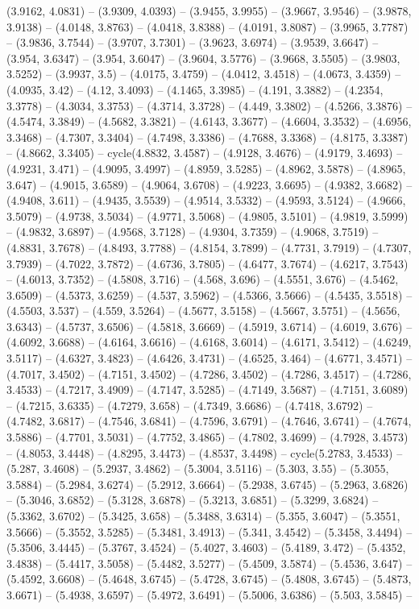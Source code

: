 (3.9162, 4.0831) -- (3.9309, 4.0393) -- (3.9455, 3.9955) -- (3.9667, 3.9546) -- (3.9878, 3.9138) -- (4.0148, 3.8763) -- (4.0418, 3.8388) -- (4.0191, 3.8087) -- (3.9965, 3.7787) -- (3.9836, 3.7544) -- (3.9707, 3.7301) -- (3.9623, 3.6974) -- (3.9539, 3.6647) -- (3.954, 3.6347) -- (3.954, 3.6047) -- (3.9604, 3.5776) -- (3.9668, 3.5505) -- (3.9803, 3.5252) -- (3.9937, 3.5) -- (4.0175, 3.4759) -- (4.0412, 3.4518) -- (4.0673, 3.4359) -- (4.0935, 3.42) -- (4.12, 3.4093) -- (4.1465, 3.3985) -- (4.191, 3.3882) -- (4.2354, 3.3778) -- (4.3034, 3.3753) -- (4.3714, 3.3728) -- (4.449, 3.3802) -- (4.5266, 3.3876) -- (4.5474, 3.3849) -- (4.5682, 3.3821) -- (4.6143, 3.3677) -- (4.6604, 3.3532) -- (4.6956, 3.3468) -- (4.7307, 3.3404) -- (4.7498, 3.3386) -- (4.7688, 3.3368) -- (4.8175, 3.3387) -- (4.8662, 3.3405) -- cycle(4.8832, 3.4587) -- (4.9128, 3.4676) -- (4.9179, 3.4693) -- (4.9231, 3.471) -- (4.9095, 3.4997) -- (4.8959, 3.5285) -- (4.8962, 3.5878) -- (4.8965, 3.647) -- (4.9015, 3.6589) -- (4.9064, 3.6708) -- (4.9223, 3.6695) -- (4.9382, 3.6682) -- (4.9408, 3.611) -- (4.9435, 3.5539) -- (4.9514, 3.5332) -- (4.9593, 3.5124) -- (4.9666, 3.5079) -- (4.9738, 3.5034) -- (4.9771, 3.5068) -- (4.9805, 3.5101) -- (4.9819, 3.5999) -- (4.9832, 3.6897) -- (4.9568, 3.7128) -- (4.9304, 3.7359) -- (4.9068, 3.7519) -- (4.8831, 3.7678) -- (4.8493, 3.7788) -- (4.8154, 3.7899) -- (4.7731, 3.7919) -- (4.7307, 3.7939) -- (4.7022, 3.7872) -- (4.6736, 3.7805) -- (4.6477, 3.7674) -- (4.6217, 3.7543) -- (4.6013, 3.7352) -- (4.5808, 3.716) -- (4.568, 3.696) -- (4.5551, 3.676) -- (4.5462, 3.6509) -- (4.5373, 3.6259) -- (4.537, 3.5962) -- (4.5366, 3.5666) -- (4.5435, 3.5518) -- (4.5503, 3.537) -- (4.559, 3.5264) -- (4.5677, 3.5158) -- (4.5667, 3.5751) -- (4.5656, 3.6343) -- (4.5737, 3.6506) -- (4.5818, 3.6669) -- (4.5919, 3.6714) -- (4.6019, 3.676) -- (4.6092, 3.6688) -- (4.6164, 3.6616) -- (4.6168, 3.6014) -- (4.6171, 3.5412) -- (4.6249, 3.5117) -- (4.6327, 3.4823) -- (4.6426, 3.4731) -- (4.6525, 3.464) -- (4.6771, 3.4571) -- (4.7017, 3.4502) -- (4.7151, 3.4502) -- (4.7286, 3.4502) -- (4.7286, 3.4517) -- (4.7286, 3.4533) -- (4.7217, 3.4909) -- (4.7147, 3.5285) -- (4.7149, 3.5687) -- (4.7151, 3.6089) -- (4.7215, 3.6335) -- (4.7279, 3.658) -- (4.7349, 3.6686) -- (4.7418, 3.6792) -- (4.7482, 3.6817) -- (4.7546, 3.6841) -- (4.7596, 3.6791) -- (4.7646, 3.6741) -- (4.7674, 3.5886) -- (4.7701, 3.5031) -- (4.7752, 3.4865) -- (4.7802, 3.4699) -- (4.7928, 3.4573) -- (4.8053, 3.4448) -- (4.8295, 3.4473) -- (4.8537, 3.4498) -- cycle(5.2783, 3.4533) -- (5.287, 3.4608) -- (5.2937, 3.4862) -- (5.3004, 3.5116) -- (5.303, 3.55) -- (5.3055, 3.5884) -- (5.2984, 3.6274) -- (5.2912, 3.6664) -- (5.2938, 3.6745) -- (5.2963, 3.6826) -- (5.3046, 3.6852) -- (5.3128, 3.6878) -- (5.3213, 3.6851) -- (5.3299, 3.6824) -- (5.3362, 3.6702) -- (5.3425, 3.658) -- (5.3488, 3.6314) -- (5.355, 3.6047) -- (5.3551, 3.5666) -- (5.3552, 3.5285) -- (5.3481, 3.4913) -- (5.341, 3.4542) -- (5.3458, 3.4494) -- (5.3506, 3.4445) -- (5.3767, 3.4524) -- (5.4027, 3.4603) -- (5.4189, 3.472) -- (5.4352, 3.4838) -- (5.4417, 3.5058) -- (5.4482, 3.5277) -- (5.4509, 3.5874) -- (5.4536, 3.647) -- (5.4592, 3.6608) -- (5.4648, 3.6745) -- (5.4728, 3.6745) -- (5.4808, 3.6745) -- (5.4873, 3.6671) -- (5.4938, 3.6597) -- (5.4972, 3.6491) -- (5.5006, 3.6386) -- (5.503, 3.5845) -- 